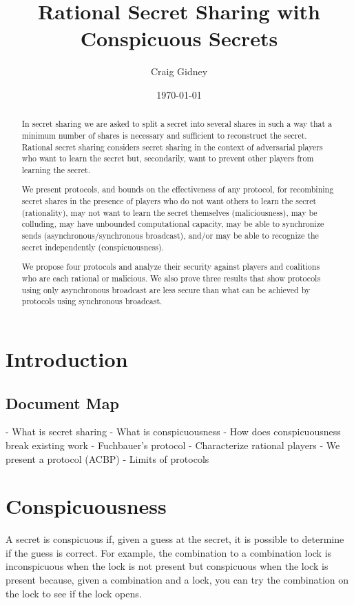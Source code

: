 \documentclass[12pt]{article}
\title{Rational Secret Sharing with Conspicuous Secrets}
\author{Craig Gidney}
\date{\today}
\begin{document}
\begin{abstract}
In secret sharing we are asked to split a secret into several shares in such a way that a minimum number of shares is necessary and sufficient to reconstruct the secret. Rational secret sharing considers secret sharing in the context of adversarial players who want to learn the secret but, secondarily, want to prevent other players from learning the secret. 

We present protocols, and bounds on the effectiveness of any protocol, for recombining secret shares in the presence of players who do not want others to learn the secret (rationality), may not want to learn the secret themselves (maliciousness), may be colluding, may have unbounded computational capacity, may be able to synchronize sends (asynchronous/synchronous broadcast), and/or may be able to recognize the secret independently (conspicuousness).

We propose four protocols and analyze their security against players and coalitions who are each rational or malicious. We also prove three results that show protocols using only asynchronous broadcast are less secure than what can be achieved by protocols using synchronous broadcast. 
\end{abstract}

\section{Introduction}

\subsection{Document Map}

- What is secret sharing
- What is conspicuousness
- How does conspicuousness break existing work
- Fuchbauer's protocol
- Characterize rational players
- We present a protocol (ACBP)
- Limits of protocols

\section{Conspicuousness}

A secret is conspicuous if, given a guess at the secret, it is possible to determine if the guess is correct. For example, the combination to a combination lock is inconspicuous when the lock is not present but conspicuous when the lock is present because, given a combination and a lock, you can try the combination on the lock to see if the lock opens.
\end{document}
